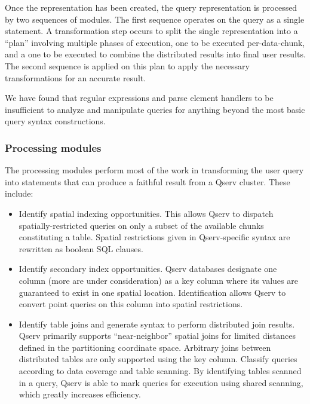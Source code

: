 \documentclass[DM,lsstdraft,toc]{lsstdoc}
\begin{document}
Once the representation has been created, the query representation is
processed by two sequences of modules. The first sequence operates on
the query as a single statement. A transformation step occurs to split
the single representation into a ``plan'' involving multiple phases of
execution, one to be executed per-data-chunk, and a one to be executed
to combine the distributed results into final user results. The second
sequence is applied on this plan to apply the necessary transformations
for an accurate result.

We have found that regular expressions and parse element handlers to be
insufficient to analyze and manipulate queries for anything beyond the
most basic query syntax constructions.

\subsubsection{Processing modules}\label{processing-modules}

The processing modules perform most of the work in transforming the user
query into statements that can produce a faithful result from a Qserv
cluster. These include:

\begin{itemize}
\item
  Identify spatial indexing opportunities. This allows Qserv to dispatch
  spatially-restricted queries on only a subset of the available chunks
  constituting a table. Spatial restrictions given in Qserv-specific
  syntax are rewritten as boolean SQL clauses.
\item
  Identify secondary index opportunities. Qserv databases designate one
  column (more are under consideration) as a key column where its values
  are guaranteed to exist in one spatial location. Identification allows
  Qserv to convert point queries on this column into spatial
  restrictions.
\item
  Identify table joins and generate syntax to perform distributed join
  results. Qserv primarily supports ``near-neighbor'' spatial joins for
  limited distances defined in the partitioning coordinate space.
  Arbitrary joins between distributed tables are only supported using
  the key column. Classify queries according to data coverage and table
  scanning. By identifying tables scanned in a query, Qserv is able to
  mark queries for execution using shared scanning, which greatly
  increases efficiency.
\end{itemize}
\end{document}
